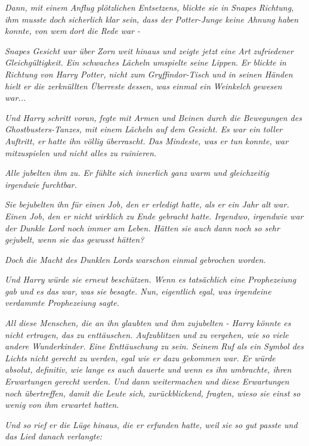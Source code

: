 {\emph{Dann, mit einem Anflug plötzlichen Entsetzens, blickte sie in Snapes Richtung, ihm musste doch} \emph{\emph{sicherlich}} \emph{klar sein, dass der Potter-Junge keine Ahnung haben konnte, von wem} \emph{dort die Rede war} \emph{-}

\emph{Snapes Gesicht war über Zorn weit hinaus und zeigte jetzt eine Art zufriedener Gleichgültigkeit. Ein schwaches Lächeln umspielte seine Lippen. Er blickte in Richtung von Harry Potter, nicht zum Gryffindor-Tisch und in seinen Händen hielt er die zerknüllten Überreste} \emph{dessen, was} \emph{einmal ein} \emph{Weinkelch} \emph{gewesen war...}

\emph{Und Harry schritt voran, fegte mit Armen und Beinen durch die Bewegungen des Ghostbusters-Tanzes, mit einem Lächeln auf dem Gesicht. Es war ein toller Auftritt, er hatte ihn völlig überrascht. Das Mindeste, was er tun konnte, war mitzuspielen und nicht alles zu ruinieren.}

\emph{Alle jubelten ihm zu. Er fühlte sich innerlich ganz warm und gleichzeitig irgendwie furchtbar.}

\emph{Sie bejubelten ihn für einen Job, den er erledigt hatte, als er ein Jahr alt} \emph{war. Einen Job, den er nicht wirklich zu Ende gebracht hatte. Irgendwo, irgendwie war der Dunkle Lord noch immer am Leben. Hätten sie auch} \emph{dann} \emph{noch so sehr gejubelt, wenn sie das gewusst hätten?}

\emph{Doch die Macht des Dunklen Lords} \emph{\emph{war}schon} \emph{einmal gebrochen worden.}

\emph{Und Harry würde sie erneut beschützen. Wenn es tatsächlich eine Prophezeiung gab und es das war, was sie besagte. Nun, eigentlich egal, was irgendeine verdammte Prophezeiung sagte.}

\emph{All diese Menschen, die an ihn glaubten und ihm zujubelten - Harry könnte es nicht ertragen, das zu enttäuschen. Aufzublitzen und zu vergehen, wie so viele andere Wunderkinder. Eine Enttäuschung zu sein. Seinem Ruf als ein Symbol des Lichts nicht gerecht zu werden, egal wie er dazu gekommen war. Er würde absolut, definitiv, wie lange es auch dauerte und wenn es ihn umbrachte, ihren} \emph{Erwartungen} \emph{gerecht werden. Und dann} \emph{weitermachen und} \emph{diese Erwartungen noch übertreffen, damit die Leute sich,} \emph{zurückblickend, fragten, wieso sie einst so wenig von ihm erwartet hatten.}

\emph{Und so rief} \emph{er die} \emph{Lüge hinaus, die er erfunden hatte, weil sie so gut passte und das Lied danach verlangte:}

}

